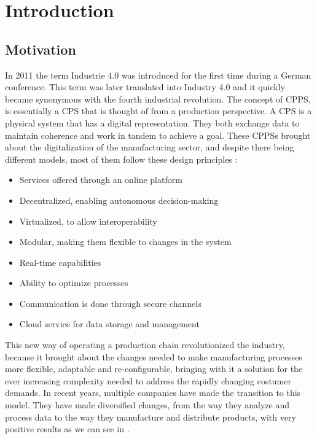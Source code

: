 

\chapter{Introduction}
\label{cha:introduction}

\section{Motivation}
\label{sec:motivation}

In 2011 the term Industrie 4.0 was introduced for the first time during a German conference. This term was later translated into Industry 4.0 and it quickly became synonymous with the fourth industrial revolution. The concept of \gls{CPPS}, is essentially a \gls{CPS} that is thought of from a production perspective. A \gls{CPS} is a physical system that has a digital representation. They both exchange data to maintain coherence and work in tandem to achieve a goal. These \gls{CPPS}s brought about the digitalization of the manufacturing sector, and despite there being different models, most of them follow these design principles \cite{birgit01}:

\begin{itemize}
	\item Services offered through an online platform
	\item Decentralized, enabling autonomous decision-making
	\item Virtualized, to allow interoperability
	\item Modular, making them flexible to changes in the system
	\item Real-time capabilities
	\item Ability to optimize processes
	\item Communication is done through secure channels
	\item Cloud service for data storage and management
\end{itemize}

This new way of operating a production chain revolutionized the industry, because it brought about the changes needed to make manufacturing processes more flexible, adaptable and re-configurable, bringing with it a solution for the ever increasing complexity needed to address the rapidly changing costumer demands.
In recent years, multiple companies have made the transition to this model. They have made diversified changes, from the way they analyze and process data to the way they manufacture and distribute products, with very positive results as we can see in \cite{rit01}. \\

